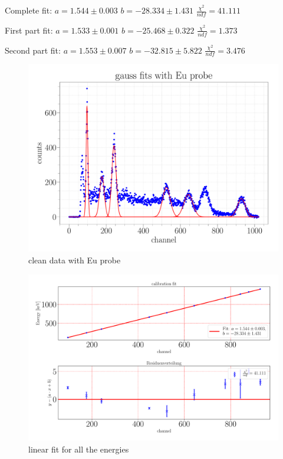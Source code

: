 \documentclass[a4paper,12pt]{article}
\begin{document}
Complete fit: \newline
$a = 1.544\pm0.003$ \newline
$b = -28.334\pm1.431$ \newline
$\frac{\chi^2}{ndf} = 41.111$ \newline

First part fit: \newline
$a = 1.533\pm0.001$ \newline
$b = -25.468\pm0.322$ \newline
$\frac{\chi^2}{ndf} = 1.373$ \newline

Second part fit: \newline
$a = 1.553\pm0.007$ \newline
$b = -32.815\pm5.822$ \newline
$\frac{\chi^2}{ndf} = 3.476$ \newline

\begin{figure}
\center
\includegraphics[scale=0.3]{../Figures/Eu_gauss.pdf}
\caption{clean data with Eu probe}
\label{Eu_gauss}
\end{figure}

\begin{figure}
\center
\includegraphics[scale=0.3]{../Figures/calibration fit.pdf}
\caption{linear fit for all the energies}
\label{calibFit}
\end{figure}
\end{document}
